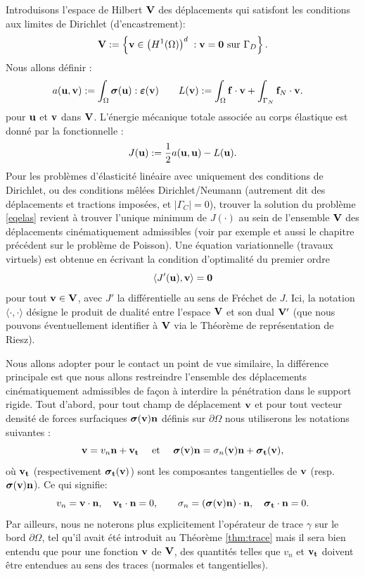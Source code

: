 \documentclass[11pt]{book}
\def\u{{\bf u}}
\def\t{{\bf t}}
\def\n{{\bf n}}
\def\f{{\bf f}}
\def\vv{{\bf v}}
\def\V{{\bf V}}
\def\0{{\bf 0}}
\newcommand{\dg}{d\Gamma}
\newcommand{\bs}{\mbox{\boldmath{$\sigma$}}}
\newcommand{\e}{\mbox{\boldmath{$\varepsilon$}}}
\begin{document}
Introduisons l'espace de Hilbert $\V$ 
des déplacements qui satisfont les conditions aux limites de Dirichlet (d'encastrement):
$$
\V :=\left\{\vv\in \left(H^1(\Omega)\right)^d \; : \vv=\0 \hbox{ sur }\Gamma_D\right\}.
$$
Nous allons définir :
\begin{eqnarray*}
   a(\u, \vv) := \int_{\Omega}  \bs(\u) : \e(\vv)
   & \qquad %
   L(\vv) :=  \displaystyle \int_{\Omega} \f \cdot \vv %
   +\int_{\Gamma_N} \f_N
   \cdot \vv. %
\end{eqnarray*}
pour $\u$ et $\vv$ dans $\V$. 
L'énergie mécanique totale associée au corps élastique est donné par la fonctionnelle :
 \[
 J ( \u ) := \frac12 a(\u , \u) - L(\u).
 \]
Pour les problèmes d'élasticité linéaire avec uniquement des conditions de Dirichlet, ou des conditions mêlées Dirichlet/Neumann (autrement dit des déplacements et tractions imposées, et $| \Gamma_C | = 0$), 
trouver la solution du problème \eqref{eqelas} revient à trouver l'unique minimum de $J(\cdot)$ au sein de l'ensemble $\V$ des déplacements cinématiquement admissibles (voir par exemple  \cite{ciarlet-78,ern-guermond-04} et aussi le chapitre précédent sur le problème de Poisson).
Une équation variationnelle (travaux virtuels) est obtenue en écrivant la condition d'optimalité du premier ordre \[\langle J'(\u) , \vv \rangle  = \0\] pour tout $\vv\in\V$, avec $J'$ la différentielle au sens de Fréchet de $J$. Ici, la notation $\langle \cdot , \cdot \rangle$ désigne le produit de dualité entre l'espace $\V$ et son dual $\V'$ (que nous pouvons éventuellement identifier à $\V$ via le Théorème de représentation de Riesz).

Nous allons adopter pour le contact un point de vue similaire, la différence principale est que nous allons restreindre l'ensemble des déplacements cinématiquement admissibles de façon à interdire la pénétration dans le support rigide.
Tout d'abord, pour tout champ de déplacement $\vv$ et pour tout vecteur densité de forces surfaciques $\bs(\vv) \n$ définis sur $\partial \Omega$ nous utiliserons les notations suivantes :
$$\vv = v_n \n +  \vv_\t  \quad \hbox{ et } \quad
  \bs(\vv) \n = \sigma_{n}(\vv)\n + \bs_{\t}(\vv),
$$
où $\vv_\t$ (respectivement $\bs_{\t}(\vv)$) sont les composantes tangentielles de $\vv$ (resp. $\bs(\vv) \n$). Ce qui signifie:
 $$
 v_n = \vv \cdot \n, \quad \vv_\t \cdot \n = 0, \qquad
 \sigma_n = ( \bs(\vv) \n ) \cdot \n, \quad \bs_{\t} \cdot \n = 0.
 $$
Par ailleurs, nous ne noterons plus explicitement l'opérateur de trace $\gamma$ sur le bord $\partial \Omega$, tel qu'il avait été introduit au Théorème \ref{thm:trace} mais il sera bien entendu que pour une fonction $\vv$ de $\V$, des quantités telles que $v_n$ et $\vv_\t$ doivent être entendues au sens des traces (normales et tangentielles).
\end{document}
